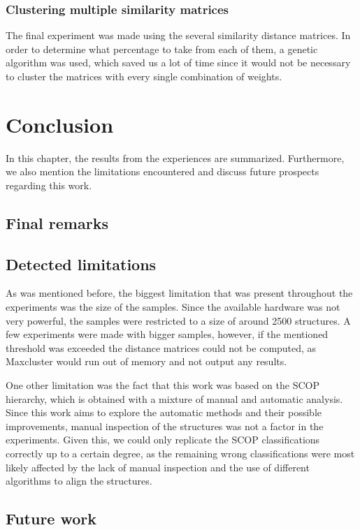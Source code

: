 \subsection{Clustering multiple similarity matrices}

The final experiment was made using the several similarity distance matrices. In order to determine what percentage to take from each of them, a genetic algorithm was used, which saved us a lot of time since it would not be necessary to cluster the matrices with every single combination of weights. 

\chapter{Conclusion}

In this chapter, the results from the experiences are summarized. Furthermore, we also mention the limitations encountered and discuss future prospects regarding this work.

\section{Final remarks}

\section{Detected limitations}

As was mentioned before, the biggest limitation that was present throughout the experiments was the size of the samples. Since the available hardware was not very powerful, the samples were restricted to a size of around 2500 structures. A few experiments were made with bigger samples, however, if the mentioned threshold was exceeded the distance matrices could not be computed, as Maxcluster would run out of memory and not output any results.

One other limitation was the fact that this work was based on the SCOP hierarchy, which is obtained with a mixture of manual and automatic analysis. Since this work aims to explore the automatic methods and their possible improvements, manual inspection of the structures was not a factor in the experiments. Given this, we could only replicate the SCOP classifications correctly up to a certain degree, as the remaining wrong classifications were most likely affected by the lack of manual inspection and the use of different algorithms to align the structures.

\section{Future work}


